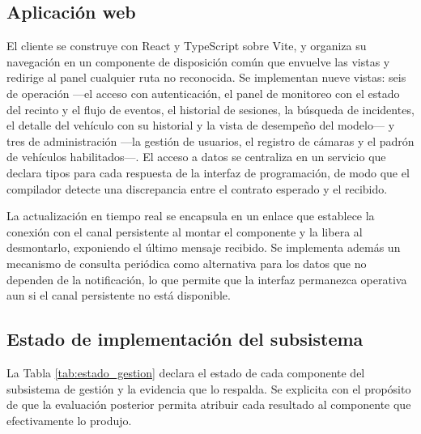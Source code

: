 \subsection{Aplicación web}

El cliente se construye con React y TypeScript sobre Vite, y organiza su
navegación en un componente de disposición común que envuelve las vistas y
redirige al panel cualquier ruta no reconocida. Se implementan nueve vistas:
seis de operación ---el acceso con autenticación, el panel de monitoreo con el
estado del recinto y el flujo de eventos, el historial de sesiones, la búsqueda
de incidentes, el detalle del vehículo con su historial y la vista de desempeño
del modelo--- y tres de administración ---la gestión de usuarios, el registro de
cámaras y el padrón de vehículos habilitados---. El acceso a datos se centraliza en un servicio que declara tipos para
cada respuesta de la interfaz de programación, de modo que el compilador detecte
una discrepancia entre el contrato esperado y el recibido.

La actualización en tiempo real se encapsula en un enlace que establece la
conexión con el canal persistente al montar el componente y la libera al
desmontarlo, exponiendo el último mensaje recibido. Se implementa además un
mecanismo de consulta periódica como alternativa para los datos que no dependen
de la notificación, lo que permite que la interfaz permanezca operativa aun si el
canal persistente no está disponible.

\subsection{Estado de implementación del subsistema}
\label{sec:estado_gestion}

La Tabla \ref{tab:estado_gestion} declara el estado de cada componente del
subsistema de gestión y la evidencia que lo respalda. Se explicita con el
propósito de que la evaluación posterior permita atribuir cada resultado al
componente que efectivamente lo produjo.

